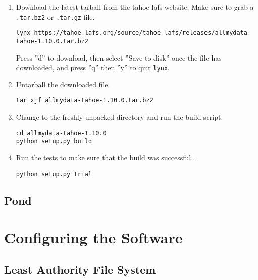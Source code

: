 \documentclass[letterpaper]{article}
\begin{document}
\begin{enumerate}

\item
Download the latest tarball from the tahoe-lafs website.  Make sure to grab a
\verb=.tar.bz2= or \verb=.tar.gz= file.
\begin{verbatim}
lynx https://tahoe-lafs.org/source/tahoe-lafs/releases/allmydata-tahoe-1.10.0.tar.bz2
\end{verbatim}
Press ''d'' to download, then select ''Save to disk'' once the file has
downloaded, and press ''q'' then ''y'' to quit \verb=lynx=.

\item
Untarball the downloaded file.
\begin{verbatim}
tar xjf allmydata-tahoe-1.10.0.tar.bz2
\end{verbatim}

\item
Change to the freshly unpacked directory and run the build script.
\begin{verbatim}
cd allmydata-tahoe-1.10.0
python setup.py build
\end{verbatim}

\item
Run the tests to make sure that the build was successful..
\begin{verbatim}
python setup.py trial
\end{verbatim}

\end{enumerate}

\subsection{Pond}

\section{Configuring the Software}

\subsection{Least Authority File System}
\end{document}

